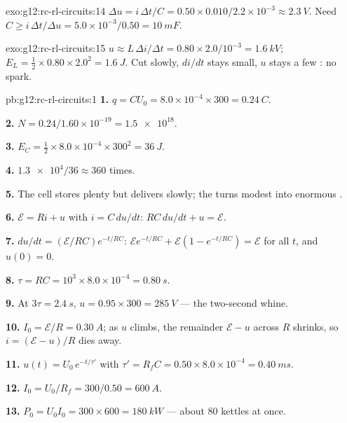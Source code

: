 \begin{solution}{exo:g12:rc-rl-circuits:14}
$\Delta u = i\,\Delta t/C = 0.50 \times 0.010/2.2\times10^{-3} \approx
\qty{2.3}{V}$. Need $C \geq i\,\Delta t/\Delta u =
5.0\times10^{-3}/0.50 = \qty{10}{mF}$.
\end{solution}

\begin{solution}{exo:g12:rc-rl-circuits:15}
$u \approx L\,\Delta i/\Delta t = 0.80 \times 2.0/10^{-3} =
\qty{1.6}{kV}$; $E_L = \tfrac12 \times 0.80 \times 2.0^2 =
\qty{1.6}{J}$. Cut slowly, $di/dt$ stays small, $u$ stays a few :
no spark.
\end{solution}

\begin{solution}{pb:g12:rc-rl-circuits:1}
\textbf{1.} $q = CU_0 = 8.0\times10^{-4} \times 300 = \qty{0.24}{C}$.

\textbf{2.} $N = 0.24/1.60\times10^{-19} = \num{1.5e18}$.

\textbf{3.} $E_C = \tfrac12 \times 8.0\times10^{-4} \times 300^2 =
\qty{36}{J}$.

\textbf{4.} $\num{1.3e4}/36 \approx 360$ times.

\textbf{5.} The cell stores plenty but delivers slowly; the 
turns modest  into enormous \emph{}.

\textbf{6.} $\mathcal{E} = Ri + u$ with $i = C\,du/dt$:
$RC\,du/dt + u = \mathcal{E}$.

\textbf{7.} $du/dt = (\mathcal{E}/RC)e^{-t/RC}$:
$\mathcal{E}e^{-t/RC} + \mathcal{E}(1 - e^{-t/RC}) = \mathcal{E}$
for all $t$, and $u(0) = 0$.

\textbf{8.} $\tau = RC = 10^3 \times 8.0\times10^{-4} = \qty{0.80}{s}$.

\textbf{9.} At $3\tau = \qty{2.4}{s}$, $u = 0.95 \times 300 =
\qty{285}{V}$ --- the two-second whine.

\textbf{10.} $I_0 = \mathcal{E}/R = \qty{0.30}{A}$; as $u$ climbs, the
remainder $\mathcal{E} - u$ across $R$ shrinks, so $i = (\mathcal{E}-u)/R$
dies away.

\textbf{11.} $u(t) = U_0\,e^{-t/\tau'}$ with $\tau' = R_f C =
0.50 \times 8.0\times10^{-4} = \qty{0.40}{ms}$.

\textbf{12.} $I_0 = U_0/R_f = 300/0.50 = \qty{600}{A}$.

\textbf{13.} $P_0 = U_0 I_0 = 300 \times 600 = \qty{180}{kW}$ --- about
$80$ kettles at once.


\end{solution}
